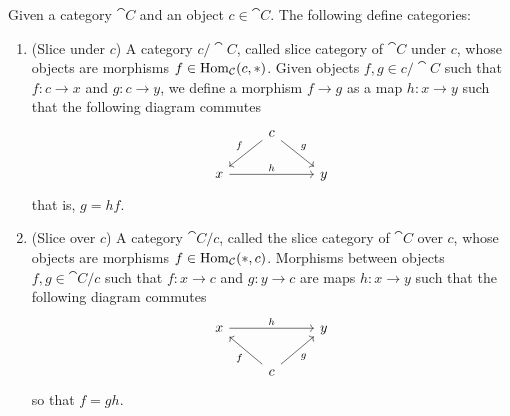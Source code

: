 \begin{proposition}\label{prop: slice cat}
  Given a category \(\cat C\) and an object \(c \in \cat C\). The following
  define categories:
  \begin{enumerate}[(SC1)]
    \item\label{prop: slice under}
      (Slice under \(c\)) A category \(c/\cat C\), called slice category of
      \(\cat C\) under \(c\), whose objects are morphisms \(f \in \operatorname{Hom}_{\mathcal
      C}(c, *)\). Given objects \(f, g \in c/\cat C\) such that \(f: c \to x\)
      and \(g: c \to y\), we define a morphism \(f \to g\) as a map \(h: x \to
      y\) such that the following diagram commutes
      \[
        \begin{tikzcd}
          &c \ar[dl, swap,"f"] \ar[dr, "g"]\\
          x \ar[rr, "h"] & &y
        \end{tikzcd}
      \]
      that is, \(g = h  f\).
    \item\label{prop: slice over}
      (Slice over \(c\)) A category \(\cat C/c\), called the slice category of
      \(\cat C\) over \(c\), whose objects are morphisms \(f \in \operatorname{Hom}_{\mathcal
      C}(*, c)\). Morphisms between objects \(f, g \in \cat C/c\) such that \(f:
      x \to c\) and \(g: y \to c\) are maps \(h: x \to y\) such that the
      following diagram commutes
      \[
        \begin{tikzcd}
          x \ar[rr, "h"]
            & &y \\
            &c \ar[ul, "f"] \ar[ur, swap, "g"]
        \end{tikzcd}
      \]
      so that \(f = g  h\).
  \end{enumerate}
\end{proposition}

